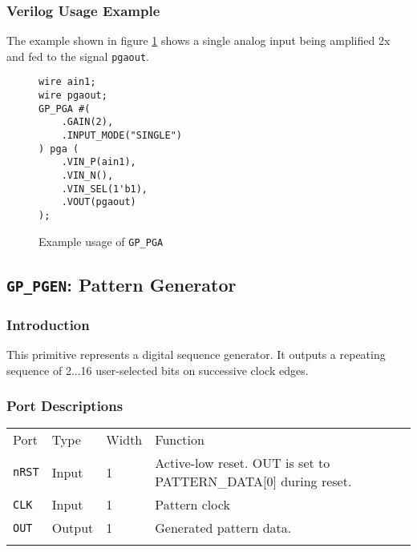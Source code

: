 \documentclass[11pt]{article}
\newcommand{\tokenstyle}[1]{\texttt{#1}}
\newcommand{\wirestyle}[1]{\texttt{#1}}
\newcommand{\whenstyle}[1]{{\fontseries{sb}\selectfont#1}}
\newcommand{\thinhline}{\Xhline{1\arrayrulewidth}}
\newcommand{\thickhline}{\Xhline{2.5\arrayrulewidth}}
\begin{document}
\subsubsection{Verilog Usage Example}

The example shown in figure \ref{gp-pga-example} shows a single analog input being amplified 2x and fed to the signal
\wirestyle{pgaout}.

\begin{figure}[h]
\begin{lstlisting}
wire ain1;
wire pgaout;
GP_PGA #(
	.GAIN(2),
	.INPUT_MODE("SINGLE")
) pga (
	.VIN_P(ain1),
	.VIN_N(),
	.VIN_SEL(1'b1),
	.VOUT(pgaout)
);
\end{lstlisting}
\caption{Example usage of \tokenstyle{GP\_PGA}}
\label{gp-pga-example}
\end{figure}


\pagebreak
\clearpage
\subsection{\tokenstyle{GP\_PGEN}: Pattern Generator}
\label{gp-pgen}

\subsubsection{Introduction}
This primitive represents a digital sequence generator. It outputs a repeating sequence of 2...16 user-selected bits
on successive clock edges.

\subsubsection{Port Descriptions}

\begin{tabularx}{\textwidth}{lllX}
\thinhline
\whenstyle{Port} & \whenstyle{Type} & \whenstyle{Width} & \whenstyle{Function} \\
\thickhline
\tokenstyle{nRST} & Input & 1 & Active-low reset. OUT is set to PATTERN\_DATA[0] during reset.\\
\thinhline
\tokenstyle{CLK} & Input & 1 & Pattern clock\\
\thinhline
\tokenstyle{OUT} & Output & 1 & Generated pattern data.\\
\thinhline
\end{tabularx}
\end{document}
